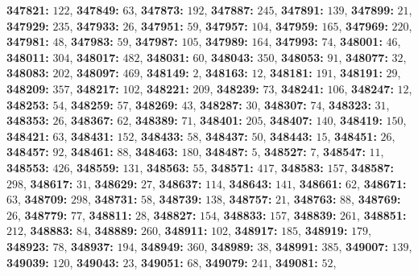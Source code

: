\textsf{\bfseries 347821:} $122$, \textsf{\bfseries 347849:} $63$, \textsf{\bfseries 347873:} $192$, \textsf{\bfseries 347887:} $245$, \textsf{\bfseries 347891:} $139$, \textsf{\bfseries 347899:} $21$, \textsf{\bfseries 347929:} $235$, \textsf{\bfseries 347933:} $26$, \textsf{\bfseries 347951:} $59$, \textsf{\bfseries 347957:} $104$, \textsf{\bfseries 347959:} $165$, \textsf{\bfseries 347969:} $220$, \textsf{\bfseries 347981:} $48$, \textsf{\bfseries 347983:} $59$, \textsf{\bfseries 347987:} $105$, \textsf{\bfseries 347989:} $164$, \textsf{\bfseries 347993:} $74$, \textsf{\bfseries 348001:} $46$, \textsf{\bfseries 348011:} $304$, \textsf{\bfseries 348017:} $482$, \textsf{\bfseries 348031:} $60$, \textsf{\bfseries 348043:} $350$, \textsf{\bfseries 348053:} $91$, \textsf{\bfseries 348077:} $32$, \textsf{\bfseries 348083:} $202$, \textsf{\bfseries 348097:} $469$, \textsf{\bfseries 348149:} $2$, \textsf{\bfseries 348163:} $12$, \textsf{\bfseries 348181:} $191$, \textsf{\bfseries 348191:} $29$, \textsf{\bfseries 348209:} $357$, \textsf{\bfseries 348217:} $102$, \textsf{\bfseries 348221:} $209$, \textsf{\bfseries 348239:} $73$, \textsf{\bfseries 348241:} $106$, \textsf{\bfseries 348247:} $12$, \textsf{\bfseries 348253:} $54$, \textsf{\bfseries 348259:} $57$, \textsf{\bfseries 348269:} $43$, \textsf{\bfseries 348287:} $30$, \textsf{\bfseries 348307:} $74$, \textsf{\bfseries 348323:} $31$, \textsf{\bfseries 348353:} $26$, \textsf{\bfseries 348367:} $62$, \textsf{\bfseries 348389:} $71$, \textsf{\bfseries 348401:} $205$, \textsf{\bfseries 348407:} $140$, \textsf{\bfseries 348419:} $150$, \textsf{\bfseries 348421:} $63$, \textsf{\bfseries 348431:} $152$, \textsf{\bfseries 348433:} $58$, \textsf{\bfseries 348437:} $50$, \textsf{\bfseries 348443:} $15$, \textsf{\bfseries 348451:} $26$, \textsf{\bfseries 348457:} $92$, \textsf{\bfseries 348461:} $88$, \textsf{\bfseries 348463:} $180$, \textsf{\bfseries 348487:} $5$, \textsf{\bfseries 348527:} $7$, \textsf{\bfseries 348547:} $11$, \textsf{\bfseries 348553:} $426$, \textsf{\bfseries 348559:} $131$, \textsf{\bfseries 348563:} $55$, \textsf{\bfseries 348571:} $417$, \textsf{\bfseries 348583:} $157$, \textsf{\bfseries 348587:} $298$, \textsf{\bfseries 348617:} $31$, \textsf{\bfseries 348629:} $27$, \textsf{\bfseries 348637:} $114$, \textsf{\bfseries 348643:} $141$, \textsf{\bfseries 348661:} $62$, \textsf{\bfseries 348671:} $63$, \textsf{\bfseries 348709:} $298$, \textsf{\bfseries 348731:} $58$, \textsf{\bfseries 348739:} $138$, \textsf{\bfseries 348757:} $21$, \textsf{\bfseries 348763:} $88$, \textsf{\bfseries 348769:} $26$, \textsf{\bfseries 348779:} $77$, \textsf{\bfseries 348811:} $28$, \textsf{\bfseries 348827:} $154$, \textsf{\bfseries 348833:} $157$, \textsf{\bfseries 348839:} $261$, \textsf{\bfseries 348851:} $212$, \textsf{\bfseries 348883:} $84$, \textsf{\bfseries 348889:} $260$, \textsf{\bfseries 348911:} $102$, \textsf{\bfseries 348917:} $185$, \textsf{\bfseries 348919:} $179$, \textsf{\bfseries 348923:} $78$, \textsf{\bfseries 348937:} $194$, \textsf{\bfseries 348949:} $360$, \textsf{\bfseries 348989:} $38$, \textsf{\bfseries 348991:} $385$, \textsf{\bfseries 349007:} $139$, \textsf{\bfseries 349039:} $120$, \textsf{\bfseries 349043:} $23$, \textsf{\bfseries 349051:} $68$, \textsf{\bfseries 349079:} $241$, \textsf{\bfseries 349081:} $52$, 
